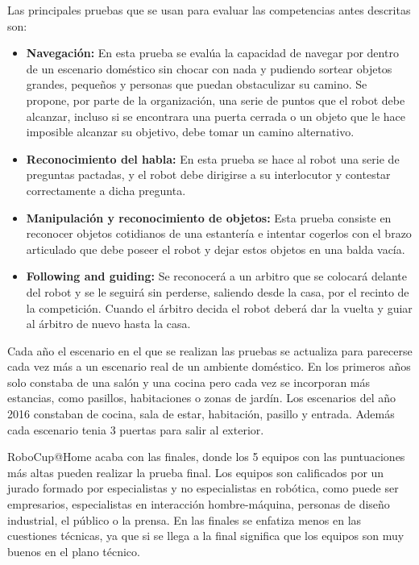 Las principales pruebas que se usan para evaluar las competencias antes descritas son:
\begin{itemize}
  \item \textbf{Navegación:} En esta prueba se evalúa la capacidad de navegar por dentro de un escenario doméstico sin chocar con nada y pudiendo sortear objetos grandes, pequeños y personas que puedan obstaculizar su camino. Se propone, por parte de la organización, una serie de puntos que el robot debe alcanzar, incluso si se encontrara una puerta cerrada o un objeto que le hace imposible alcanzar su objetivo, debe tomar un camino alternativo.
  \item \textbf{Reconocimiento del habla:} En esta prueba se hace al robot una serie de preguntas pactadas, y el robot debe dirigirse a su interlocutor y contestar correctamente a dicha pregunta.
  \item \textbf{Manipulación y reconocimiento de objetos:} Esta prueba consiste en reconocer objetos cotidianos de una estantería e intentar cogerlos con el brazo articulado que debe poseer el robot y dejar estos objetos en una balda vacía. 
  \item \textbf{Following and guiding:} Se reconocerá a un arbitro que se colocará delante del robot y se le seguirá sin perderse, saliendo desde la casa, por el recinto de la competición. Cuando el árbitro decida el robot deberá dar la vuelta y guiar al árbitro de nuevo hasta la casa.
\end{itemize}


Cada año el escenario en el que se realizan las pruebas se actualiza para parecerse cada vez más a un escenario real de un ambiente doméstico. En los primeros años solo constaba de una salón y una cocina pero cada vez se incorporan más estancias, como pasillos, habitaciones o zonas de jardín. Los escenarios del año 2016 constaban de cocina, sala de estar, habitación, pasillo y entrada. Además cada escenario tenia 3 puertas para salir al exterior.

RoboCup@Home acaba con las finales, donde los 5 equipos con las puntuaciones más altas pueden realizar la prueba final. Los equipos son calificados por un jurado formado por especialistas y no especialistas en robótica, como puede ser empresarios, especialistas en interacción hombre-máquina, personas de diseño industrial, el público o la prensa. En las finales se enfatiza menos en las cuestiones técnicas, ya que si se llega a la final significa que los equipos son muy buenos en el plano técnico.

